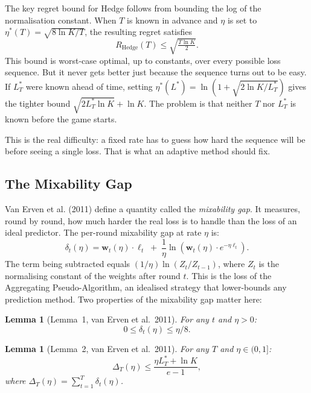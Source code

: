 \documentclass[11pt,a4paper]{article}
\newtheorem{lemma}[theorem]{Lemma}
\newcommand{\wt}{\boldsymbol{w}_t}
\newcommand{\bsl}{\boldsymbol{\ell}}
\newcommand{\Lstar}{L_T^*}
\begin{document}
The key regret bound for Hedge follows from bounding the log of the normalisation
constant.  When $T$ is known in advance and $\eta$ is set to
$\eta^*(T) = \sqrt{8 \ln K / T}$, the resulting regret satisfies
\begin{equation}
  \label{eq:hedge_bound}
  R_{\mathrm{Hedge}}(T) \le \sqrt{\tfrac{T \ln K}{2}}.
\end{equation}
This bound is worst-case optimal, up to constants, over every possible loss
sequence. But it never gets better just because the sequence turns out to be
easy. If $\Lstar$ were known ahead of time, setting
$\eta^*(L^*) = \ln\!\left(1 + \sqrt{2\ln K / \Lstar}\right)$ gives the tighter
bound $\sqrt{2 \Lstar \ln K} + \ln K$. The problem is that neither $T$ nor
$\Lstar$ is known before the game starts.

This is the real difficulty: a fixed rate has to guess how hard the sequence
will be before seeing a single loss. That is what an adaptive method should
fix.

\subsection{The Mixability Gap}

Van Erven et al. (2011) define a quantity called the \emph{mixability gap}. It
measures, round by round, how much harder the real loss is to handle than the
loss of an ideal predictor. The per-round mixability gap at rate $\eta$ is:
\begin{equation}
  \label{eq:mixgap}
  \delta_t(\eta)
    = \wt(\eta) \cdot \bsl_t
    \;+\; \frac{1}{\eta} \ln\!\left(\wt(\eta) \cdot e^{-\eta \bsl_t}\right).
\end{equation}
The term being subtracted equals $(1/\eta)\ln(Z_t/Z_{t-1})$, where $Z_t$ is the
normalising constant of the weights after round $t$. This is the loss of the
Aggregating Pseudo-Algorithm, an idealised strategy that lower-bounds any
prediction method. Two properties of the mixability gap matter here:

\begin{lemma}[Lemma~1, van Erven et al.\ 2011]
  \label{lem:hoeffding}
  For any $t$ and $\eta > 0$:
  \[
    0 \le \delta_t(\eta) \le \eta/8.
  \]
\end{lemma}

\begin{lemma}[Lemma~2, van Erven et al.\ 2011]
  \label{lem:lstar}
  For any $T$ and $\eta \in (0,1]$:
  \[
    \Delta_T(\eta) \le \frac{\eta \Lstar + \ln K}{e - 1},
  \]
  where $\Delta_T(\eta) = \sum_{t=1}^T \delta_t(\eta)$.
\end{lemma}
\end{document}
